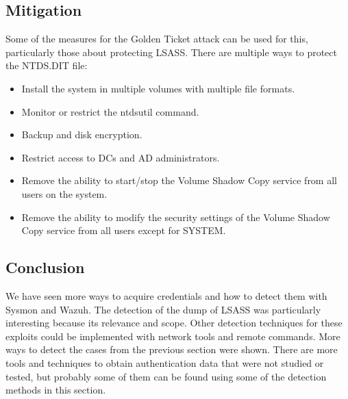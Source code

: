 \subsection{Mitigation}
Some of the measures for the Golden Ticket attack can be used for this, particularly those about protecting LSASS.
\linej
There are multiple ways to protect the NTDS.DIT file\cite{protect_NTDS}\cite{hood}:
\begin{itemize}
	\item Install the system in multiple volumes with multiple file formats.
	\item Monitor or restrict the ntdsutil command.
	\item Backup and disk encryption.
	\item Restrict access to DCs and AD administrators.
	\item Remove the ability to start/stop the Volume Shadow Copy service from all users on the system.
	\item Remove the ability to modify the security settings of the Volume Shadow Copy service from all users except for SYSTEM.
\end{itemize}

\subsection{Conclusion}
We have seen more ways to acquire credentials and how to detect them with Sysmon and Wazuh. The detection of the dump of LSASS was particularly interesting because its relevance and scope.
\linej
Other detection techniques for these exploits could be implemented with network tools and remote commands.
More ways to detect the cases from the previous section were shown.
There are more tools and techniques to obtain authentication data that were not studied or tested, but probably some of them can be found using some of the detection methods in this section.

